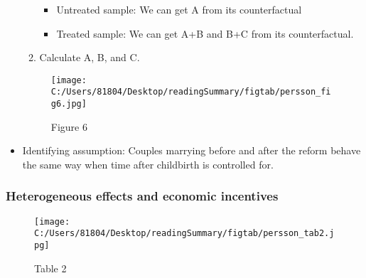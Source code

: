 \documentclass[a4paper, 12pt]{article}
\begin{document}
\begin{itemize}
\begin{enumerate}
\begin{itemize}
\item Untreated sample: We can get A from its counterfactual
\item Treated sample: We can get A+B and B+C from its counterfactual.
\end{itemize}
\item Calculate A, B, and C.
\end{enumerate}
\begin{figure}[h!]
\center
\texttt{[image: C:/Users/81804/Desktop/readingSummary/figtab/persson\_fig6.jpg]}
\caption*{Figure 6}
\end{figure}
\item Identifying assumption: Couples marrying before and after the reform behave the same way when time after childbirth is controlled for.
\end{itemize}

\subsubsection{Heterogeneous effects and economic incentives}

\begin{figure}[h!]
\center
\texttt{[image: C:/Users/81804/Desktop/readingSummary/figtab/persson\_tab2.jpg]}
\caption*{Table 2}
\end{figure}
\end{document}
